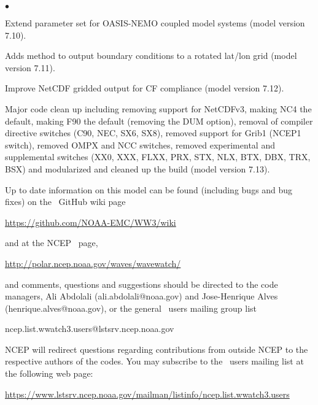 \begin{list}{$\bullet$}{\rightmargin 5mm \parsep 0mm \itemsep 0mm}
\item Extend parameter set for OASIS-NEMO coupled model systems (model version 7.10).

\item Adds method to output boundary conditions to a rotated lat/lon grid (model version 7.11).

\item Improve NetCDF gridded output for CF compliance (model version 7.12).

\item Major code clean up including removing support for NetCDFv3, making NC4 the default, 
      making F90 the default (removing the DUM option), removal of compiler directive 
      switches (C90, NEC, SX6, SX8), removed support for Grib1 (NCEP1 switch), removed OMPX 
      and NCC switches, removed experimental and supplemental switches (XX0, XXX, FLXX, PRX, 
      STX, NLX, BTX, DBX, TRX, BSX) and modularized and cleaned up the build (model version 7.13).

\end{list}

\vspace{\baselineskip} \noindent 
Up to date information on this model can be found (including bugs and bug
fixes) on the \ws\ GitHub wiki page
\begin{center}
\url{https://github.com/NOAA-EMC/WW3/wiki}
\end{center}
and at the NCEP \ws\ page, 
\begin{center}
\url{http://polar.ncep.noaa.gov/waves/wavewatch/}
\end{center}
and comments, questions and suggestions should be
directed to the code managers, Ali Abdolali (ali.abdolali@noaa.gov) and Jose-Henrique Alves (henrique.alves@noaa.gov), or the general \ws\ users mailing group list

\begin{center}
ncep.list.wwatch3.users@lstsrv.ncep.noaa.gov
\end{center}

\noindent
NCEP will redirect questions regarding contributions from outside NCEP to the
respective authors of the codes. You may subscribe to the \ws\ users 
mailing list at the following web page:
\begin{center}
\footnotesize
\url{https://www.lstsrv.ncep.noaa.gov/mailman/listinfo/ncep.list.wwatch3.users}
\end{center} 

\nocite{tol:OMOD02b}
\nocite{tol:PACO02}
\nocite{tol:GAOS02}
\nocite{tol:OMB02b}
\nocite{tol:OMB02c}
